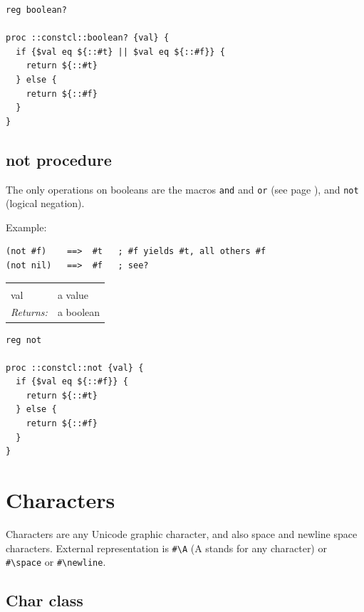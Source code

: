 \documentclass[a5paper,draft]{memoir}
\begin{document}
\begin{lstlisting}
reg boolean?

proc ::constcl::boolean? {val} {
  if {$val eq ${::#t} || $val eq ${::#f}} {
    return ${::#t}
  } else {
    return ${::#f}
  }
}
\end{lstlisting}

\subsection{not procedure}
\label{not-procedure}

The only operations on booleans are the macros \texttt{and} and \texttt{or} (see page \pageref{macros}), and \texttt{not} (logical negation).

Example:

\begin{verbatim}
(not #f)    ==>  #t   ; #f yields #t, all others #f
(not nil)   ==>  #f   ; see?
\end{verbatim}

\noindent\begin{tabular}{ |p{1.9cm} p{6.5cm}| }
\hline
\rowcolor[HTML]{CCCCCC} \multicolumn{2}{|l|}{\textbf{not (public)}} \\
val & a value \\
\textit{Returns:} & a boolean \\
\hline
\end{tabular}

\begin{lstlisting}
reg not

proc ::constcl::not {val} {
  if {$val eq ${::#f}} {
    return ${::#t}
  } else {
    return ${::#f}
  }
}
\end{lstlisting}

\section{Characters}
\label{characters}

Characters are any Unicode graphic character, and also space and newline space characters. External representation is \texttt{\#\textbackslash A} (A stands for any character) or \texttt{\#\textbackslash space} or \texttt{\#\textbackslash newline}.

\subsection{Char class}
\label{char-class}
\end{document}
